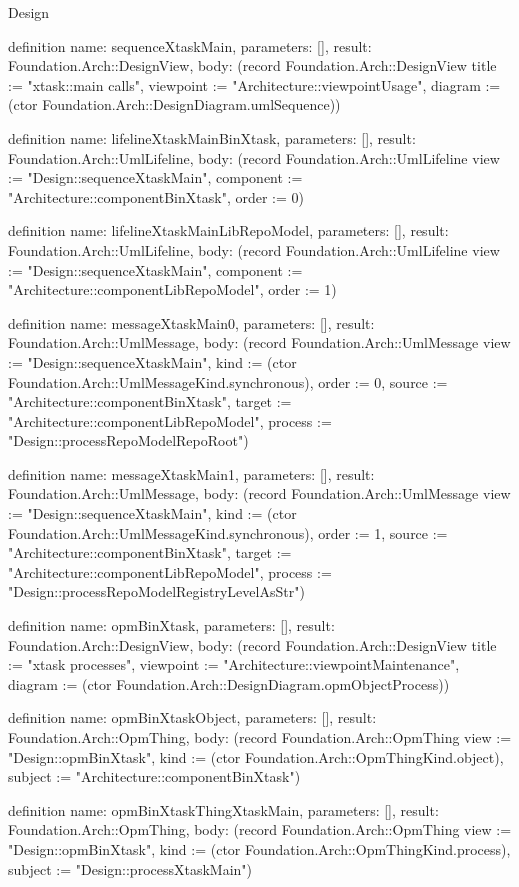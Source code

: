 \begin{lexlean}{Design}
\begin{semanticmodule}
definition{
  name: sequenceXtaskMain,
  parameters: [],
  result: Foundation.Arch::DesignView,
  body: (record Foundation.Arch::DesignView {title := "xtask::main calls", viewpoint := "Architecture::viewpointUsage", diagram := (ctor Foundation.Arch::DesignDiagram.umlSequence)})
}

definition{
  name: lifelineXtaskMainBinXtask,
  parameters: [],
  result: Foundation.Arch::UmlLifeline,
  body: (record Foundation.Arch::UmlLifeline {view := "Design::sequenceXtaskMain", component := "Architecture::componentBinXtask", order := 0})
}

definition{
  name: lifelineXtaskMainLibRepoModel,
  parameters: [],
  result: Foundation.Arch::UmlLifeline,
  body: (record Foundation.Arch::UmlLifeline {view := "Design::sequenceXtaskMain", component := "Architecture::componentLibRepoModel", order := 1})
}

definition{
  name: messageXtaskMain0,
  parameters: [],
  result: Foundation.Arch::UmlMessage,
  body: (record Foundation.Arch::UmlMessage {view := "Design::sequenceXtaskMain", kind := (ctor Foundation.Arch::UmlMessageKind.synchronous), order := 0, source := "Architecture::componentBinXtask", target := "Architecture::componentLibRepoModel", process := "Design::processRepoModelRepoRoot"})
}

definition{
  name: messageXtaskMain1,
  parameters: [],
  result: Foundation.Arch::UmlMessage,
  body: (record Foundation.Arch::UmlMessage {view := "Design::sequenceXtaskMain", kind := (ctor Foundation.Arch::UmlMessageKind.synchronous), order := 1, source := "Architecture::componentBinXtask", target := "Architecture::componentLibRepoModel", process := "Design::processRepoModelRegistryLevelAsStr"})
}

definition{
  name: opmBinXtask,
  parameters: [],
  result: Foundation.Arch::DesignView,
  body: (record Foundation.Arch::DesignView {title := "xtask processes", viewpoint := "Architecture::viewpointMaintenance", diagram := (ctor Foundation.Arch::DesignDiagram.opmObjectProcess)})
}

definition{
  name: opmBinXtaskObject,
  parameters: [],
  result: Foundation.Arch::OpmThing,
  body: (record Foundation.Arch::OpmThing {view := "Design::opmBinXtask", kind := (ctor Foundation.Arch::OpmThingKind.object), subject := "Architecture::componentBinXtask"})
}

definition{
  name: opmBinXtaskThingXtaskMain,
  parameters: [],
  result: Foundation.Arch::OpmThing,
  body: (record Foundation.Arch::OpmThing {view := "Design::opmBinXtask", kind := (ctor Foundation.Arch::OpmThingKind.process), subject := "Design::processXtaskMain"})
}


\end{semanticmodule}
\end{lexlean}
